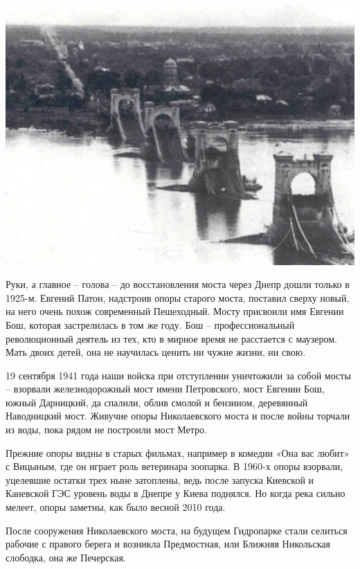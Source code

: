 \vspace*{\fill}
\begin{center}
\includegraphics[width=\linewidth]{chast-gorodki/cherto/1920-cep.jpg}
\end{center}
\vspace*{\fill}
\newpage

Руки, а главное – голова – до восстановления моста через Днепр дошли только в 1925-м. Евгений Патон, надстроив опоры старого моста, поставил сверху новый, на него очень похож современный Пешеходный. Мосту присвоили имя Евгении Бош, которая застрелилась в том же году. Бош – профессиональный революционный деятель из тех, кто в мирное время не расстается с маузером. Мать двоих детей, она не научилась ценить ни чужие жизни, ни свою.

19 сентября 1941 года наши войска при отступлении уничтожили за собой мосты – взорвали железнодорожный мост имени Петровского, мост Евгении Бош, южный Дарницкий, да спалили, облив смолой и бензином, деревянный Наводницкий мост. Живучие опоры Николаевского моста и после войны торчали из воды, пока рядом не построили мост Метро.

Прежние опоры видны в старых фильмах, например в комедии «Она вас любит» с Вицыным, где он играет роль ветеринара зоопарка. В 1960-х опоры взорвали, уцелевшие остатки трех ныне затоплены, ведь после запуска Киевской и Каневской ГЭС уровень воды в Днепре у Киева поднялся. Но когда река сильно мелеет, опоры заметны, как было весной 2010 года.

После сооружения Николаевского моста, на будущем Гидропарке стали селиться рабочие с правого берега и возникла Предмостная, или Ближняя Никольская слободка, она же Печерская.

